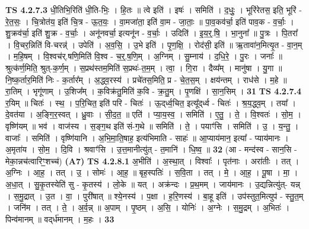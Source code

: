 \documentclass[17pt]{extarticle}
\begin{document}
                  \newline
                                \textbf{ TS 4.2.7.3} \newline
                  धी॒तिभि॒रिति॑ धी॒ति-भिः॒ । हि॒तः ॥ त्वे इति॑ । इषः॑ । समिति॑ । द॒धुः॒ । भूरि॑रेतस॒ इति॒ भूरि॑ - रे॒त॒सः॒ । चि॒त्रोत॑य॒ इति॑ चि॒त्र - ऊ॒त॒यः॒ । वा॒मजा॑ता॒ इति॑ वा॒म - जा॒ताः॒ ॥ पा॒व॒कव॑र्चा॒ इति॑ पाव॒क - व॒र्चाः॒ । शु॒क्रव॑र्चा॒ इति॑ शु॒क्र - व॒र्चाः॒ । अनू॑नवर्चा॒ इत्यनू॑न - व॒र्चाः॒ । उदिति॑ । इ॒य॒र्॒.षि॒ । भा॒नुना᳚ ॥ पु॒त्रः । पि॒तरा᳚ । वि॒चर॒न्निति॑ वि-चरन्न्॑ । उपेति॑ । अ॒व॒सि॒ । उ॒भे इति॑ । पृ॒ण॒क्षि॒ । रोद॑सी॒ इति॑ ॥ ऋ॒तावा॑न॒मित्यृ॒त - वा॒न॒म् । म॒हि॒षम् । वि॒श्वच॑र्.षणि॒मिति॑ वि॒श्व - च॒र्॒.ष॒णि॒म् । अ॒ग्निम् । सु॒म्नाय॑ । द॒धि॒रे॒ । पु॒रः । जनाः᳚ ॥ श्रुत्क॑र्ण॒मिति॒ श्रुत्-क॒र्ण॒म् । स॒प्रथ॑स्तम॒मिति॑ स॒प्रथः॑-त॒म॒म् । त्वा॒ । गि॒रा । दैव्य᳚म् । मानु॑षा । यु॒गा ॥ नि॒ष्क॒र्तार॒मिति॑ निः - क॒र्तार᳚म् । अ॒द्ध्व॒रस्य॑ । प्रचे॑तस॒मिति॒ प्र - चे॒त॒स॒म् । क्षय॑न्तम् । राध॑से । म॒हे ॥ रा॒तिम् । भृगू॑णाम् । उ॒शिज᳚म् । क॒विक्र॑तु॒मिति॑ क॒वि - क्र॒तु॒म् । पृ॒णक्षि॑ । सा॒न॒सिम् । \textbf{  31} \newline
                  \newline
                                \textbf{ TS 4.2.7.4} \newline
                  र॒यिम् ॥ चितः॑ । स्थ॒ । प॒रि॒चित॒ इति॑ परि - चितः॑ । ऊ॒द्‌र्ध्व॒चित॒ इत्यू᳚द्‌र्ध्व - चितः॑ । श्र॒य॒द्ध्व॒म् । तया᳚ । दे॒वत॑या । अ॒ङ्गि॒र॒स्वत् । ध्रु॒वाः । सी॒द॒त॒ ॥ एति॑ । प्या॒य॒स्व॒ । समिति॑ । ए॒तु॒ । ते॒ । वि॒श्वतः॑ । सो॒म॒ । वृष्णि॑यम् ॥ भव॑ । वाज॑स्य । स॒ङ्ग॒थ इति॑ सं-ग॒थे ॥ समिति॑ । ते॒ । पयाꣳ॑सि । समिति॑ । उ॒ । य॒न्तु॒ । वाजाः᳚ । समिति॑ । वृष्णि॑यानि । अ॒भि॒मा॒ति॒षाह॒ इत्य॑भिमाति - साहः॑ ॥ आ॒प्याय॑मान॒ इत्या᳚ - प्याय॑मानः । अ॒मृता॑य । सो॒म॒ । दि॒वि । श्रवाꣳ॑सि । उ॒त्त॒मानीत्यु॑त् - त॒मानि॑ । धि॒ष्व॒ ॥ \textbf{  32} \newline
                  \newline
                      (आ - मन्द॑स्व - सान॒सि - मेका॒न्नच॑त्वारिꣳ॒॒शच्च॑)  \textbf{(A7)} \newline \newline
                                \textbf{ TS 4.2.8.1} \newline
                  अ॒भीति॑ । अ॒स्था॒त् । विश्वाः᳚ । पृत॑नाः । अरा॑तीः । तत् । अ॒ग्निः । आ॒ह॒ । तत् । उ॒ । सोमः॑ । आ॒ह॒ ॥ बृह॒स्पतिः॑ । स॒वि॒ता । तत् । मे॒ । आ॒ह॒ । पू॒षा । मा॒ । अ॒धा॒त् । सु॒कृ॒तस्येति॑ सु - कृ॒तस्य॑ । लो॒के ॥ यत् । अक्र॑न्दः । प्र॒थ॒मम् । जाय॑मानः । उ॒द्यन्नित्यु॑त्- यन्न् । स॒मु॒द्रात् । उ॒त । वा॒ । पुरी॑षात् ॥ श्ये॒नस्य॑ । प॒क्षा । ह॒रि॒णस्य॑ । बा॒हू इति॑ । उप॑स्तुत॒मित्युप॑ - स्तु॒त॒म् । जनि॑म । तत् । ते॒ । अ॒र्व॒न्न् ॥ अ॒पाम् । पृ॒ष्ठम् । अ॒सि॒ । योनिः॑ । अ॒ग्नेः । स॒मु॒द्रम् । अ॒भितः॑ । पिन्व॑मानम् ॥ वद्‌र्ध॑मानम् । म॒हः । \textbf{  33} \newline
\end{document}
